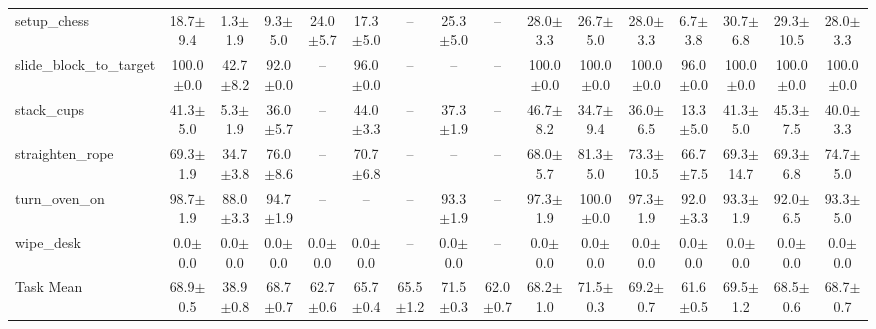 \begin{table}[t]
{\begin{tabular}{l*{15}{c}}
setup\_chess & 18.7$\pm$9.4 & 1.3$\pm$1.9 & 9.3$\pm$5.0 & 24.0$\pm$5.7 & 17.3$\pm$5.0 & -- & 25.3$\pm$5.0 & -- & 28.0$\pm$3.3 & 26.7$\pm$5.0 & 28.0$\pm$3.3 & 6.7$\pm$3.8 & 30.7$\pm$6.8 & 29.3$\pm$10.5 & 28.0$\pm$3.3 \\
slide\_block\_to\_target & 100.0$\pm$0.0 & 42.7$\pm$8.2 & 92.0$\pm$0.0 & -- & 96.0$\pm$0.0 & -- & -- & -- & 100.0$\pm$0.0 & 100.0$\pm$0.0 & 100.0$\pm$0.0 & 96.0$\pm$0.0 & 100.0$\pm$0.0 & 100.0$\pm$0.0 & 100.0$\pm$0.0 \\
stack\_cups & 41.3$\pm$5.0 & 5.3$\pm$1.9 & 36.0$\pm$5.7 & -- & 44.0$\pm$3.3 & -- & 37.3$\pm$1.9 & -- & 46.7$\pm$8.2 & 34.7$\pm$9.4 & 36.0$\pm$6.5 & 13.3$\pm$5.0 & 41.3$\pm$5.0 & 45.3$\pm$7.5 & 40.0$\pm$3.3 \\
straighten\_rope & 69.3$\pm$1.9 & 34.7$\pm$3.8 & 76.0$\pm$8.6 & -- & 70.7$\pm$6.8 & -- & -- & -- & 68.0$\pm$5.7 & 81.3$\pm$5.0 & 73.3$\pm$10.5 & 66.7$\pm$7.5 & 69.3$\pm$14.7 & 69.3$\pm$6.8 & 74.7$\pm$5.0 \\
turn\_oven\_on & 98.7$\pm$1.9 & 88.0$\pm$3.3 & 94.7$\pm$1.9 & -- & -- & -- & 93.3$\pm$1.9 & -- & 97.3$\pm$1.9 & 100.0$\pm$0.0 & 97.3$\pm$1.9 & 92.0$\pm$3.3 & 93.3$\pm$1.9 & 92.0$\pm$6.5 & 93.3$\pm$5.0 \\
wipe\_desk & 0.0$\pm$0.0 & 0.0$\pm$0.0 & 0.0$\pm$0.0 & 0.0$\pm$0.0 & 0.0$\pm$0.0 & -- & 0.0$\pm$0.0 & -- & 0.0$\pm$0.0 & 0.0$\pm$0.0 & 0.0$\pm$0.0 & 0.0$\pm$0.0 & 0.0$\pm$0.0 & 0.0$\pm$0.0 & 0.0$\pm$0.0 \\
\midrule
Task Mean & 68.9$\pm$0.5 & 38.9$\pm$0.8 & 68.7$\pm$0.7 & 62.7$\pm$0.6 & 65.7$\pm$0.4 & 65.5$\pm$1.2 & 71.5$\pm$0.3 & 62.0$\pm$0.7 & 68.2$\pm$1.0 & 71.5$\pm$0.3 & 69.2$\pm$0.7 & 61.6$\pm$0.5 & 69.5$\pm$1.2 & 68.5$\pm$0.6 & 68.7$\pm$0.7 \\
\bottomrule
\end{tabular}%
}
\end{table}
